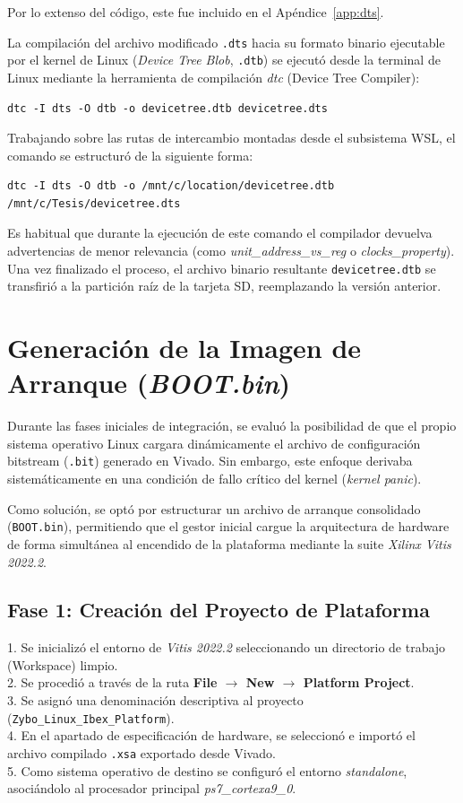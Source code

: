 Por lo extenso del código, este fue incluido en el Apéndice~\ref{app:dts}.

La compilación del archivo modificado \texttt{.dts} hacia su formato binario ejecutable por el kernel de Linux (\textit{Device Tree Blob}, \texttt{.dtb}) se ejecutó desde la terminal de Linux mediante la herramienta de compilación \textit{dtc} (Device Tree Compiler):

\begin{lstlisting}[style=bashstyle]
dtc -I dts -O dtb -o devicetree.dtb devicetree.dts
\end{lstlisting}

Trabajando sobre las rutas de intercambio montadas desde el subsistema WSL, el comando se estructuró de la siguiente forma:

\begin{lstlisting}[style=bashstyle]
dtc -I dts -O dtb -o /mnt/c/location/devicetree.dtb /mnt/c/Tesis/devicetree.dts
\end{lstlisting}

Es habitual que durante la ejecución de este comando el compilador devuelva advertencias de menor relevancia (como \textit{unit\_address\_vs\_reg} o \textit{clocks\_property}). Una vez finalizado el proceso, el archivo binario resultante \texttt{devicetree.dtb} se transfirió a la partición raíz de la tarjeta SD, reemplazando la versión anterior.

\section{Generación de la Imagen de Arranque (\textit{BOOT.bin})}
Durante las fases iniciales de integración, se evaluó la posibilidad de que el propio sistema operativo Linux cargara dinámicamente el archivo de configuración bitstream (\texttt{.bit}) generado en Vivado. Sin embargo, este enfoque derivaba sistemáticamente en una condición de fallo crítico del kernel (\textit{kernel panic}). 

Como solución, se optó por estructurar un archivo de arranque consolidado (\texttt{BOOT.bin}), permitiendo que el gestor inicial cargue la arquitectura de hardware de forma simultánea al encendido de la plataforma mediante la suite \textit{Xilinx Vitis 2022.2}.

\subsection{Fase 1: Creación del Proyecto de Plataforma}
1. Se inicializó el entorno de \textit{Vitis 2022.2} seleccionando un directorio de trabajo (Workspace) limpio.\\
2. Se procedió a través de la ruta \textbf{File $\rightarrow$ New $\rightarrow$ Platform Project}.\\
3. Se asignó una denominación descriptiva al proyecto (\texttt{Zybo\_Linux\_Ibex\_Platform}).\\
4. En el apartado de especificación de hardware, se seleccionó e importó el archivo compilado \texttt{.xsa} exportado desde Vivado.\\
5. Como sistema operativo de destino se configuró el entorno \textit{standalone}, asociándolo al procesador principal \textit{ps7\_cortexa9\_0}.

